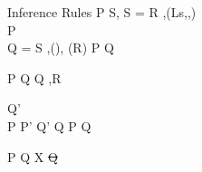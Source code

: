 \documentclass[a4paper,notitlepage]{report}
\begin{document}
\begin{display}{Inference Rules}
    {\tr P {} {S\sep\rv\doteq{}} \qquad
    S = R \sep \getValue(Ls,,)\\
      {} P\\
     Q = S \sep \isfalse()\sep\rv\doteq\und\qquad
     \rv\not\in \fv(R)}
    {\tr P {} Q}
  \vg

    {\tr P {} Q}
    { {} {Q \sep R}}

    { {} {Q'} \\
     P \impl P' \quad Q' \impl Q}
    {\tr P {} Q}
  \vg

    {\tr P {} Q}
    { {} {\exists X \st Q}}

    { \quad {}}
    {}
\end{display}
\end{document}
